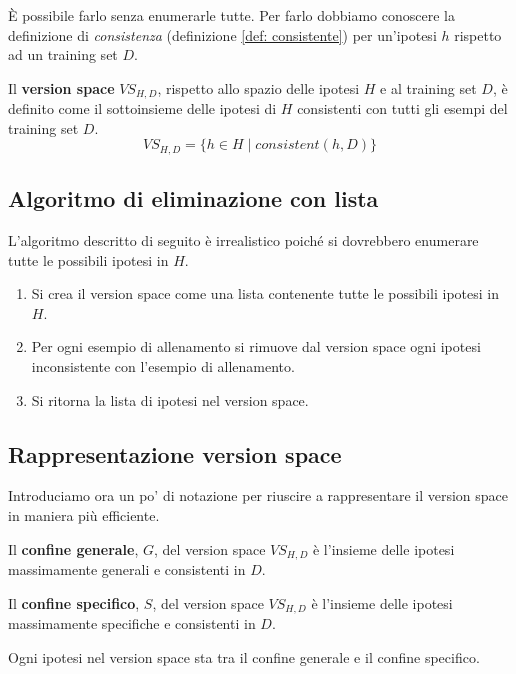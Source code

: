 \`E possibile farlo senza enumerarle tutte. Per farlo dobbiamo conoscere la definizione di \emph{consistenza} (definizione
\ref{def: consistente}) per un'ipotesi $h$ rispetto ad un training set $D$.

\begin{definition}
	Il \textbf{version space} $VS_{H, D}$, rispetto allo spazio delle ipotesi $H$ e al training set $D$, \`e definito
	come il sottoinsieme delle ipotesi di $H$ consistenti con tutti gli esempi del training set $D$.
	\[ VS_{H, D} = \{ h \in H \mid consistent(h, D) \} \]
\end{definition}

\subsection{Algoritmo di eliminazione con lista}
L'algoritmo descritto di seguito \`e irrealistico poich\'e si dovrebbero enumerare tutte le possibili ipotesi in $H$.
\begin{enumerate}
	\item Si crea il version space come una lista contenente tutte le possibili ipotesi in $H$.
	\item Per ogni esempio di allenamento si rimuove dal version space ogni ipotesi inconsistente con l'esempio
	      di allenamento.
	\item Si ritorna la lista di ipotesi nel version space.
\end{enumerate}

\subsection{Rappresentazione version space}
Introduciamo ora un po' di notazione per riuscire a rappresentare il version space in maniera pi\`u efficiente.

\begin{definition}
	Il \textbf{confine generale}, $G$, del version space $VS_{H, D}$ \`e l'insieme delle ipotesi massimamente generali
	e consistenti in $D$.
\end{definition}

\begin{definition}
	Il \textbf{confine specifico}, $S$, del version space $VS_{H, D}$ \`e l'insieme delle ipotesi massimamente specifiche
	e consistenti in $D$.
\end{definition}

\begin{theorem}
	Ogni ipotesi nel version space sta tra il confine generale e il confine specifico.
\end{theorem}

